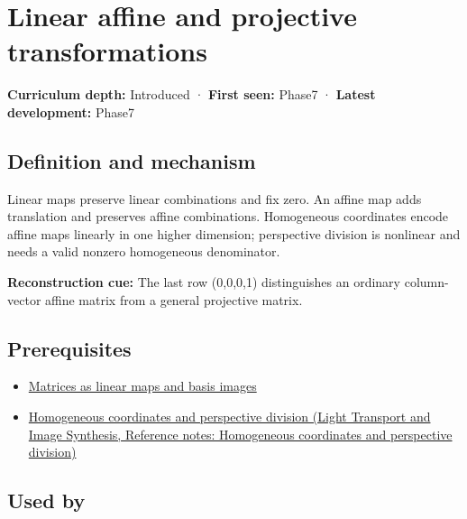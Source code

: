 \hypertarget{appendix-0bf0ca73f735}{}\label{referencestart:appendix-0bf0ca73f735}
\section{Linear affine and projective transformations}\label{appendix-0bf0ca73f735-linear-affine-and-projective-transformations}

\textbf{Curriculum depth:} Introduced · \textbf{First seen:} Phase7 · \textbf{Latest development:} Phase7

\begin{allmightroledefinition}

\subsection{Definition and mechanism}\label{appendix-0bf0ca73f735-definition-and-mechanism}

Linear maps preserve linear combinations and fix zero. An affine map adds translation and preserves affine combinations. Homogeneous coordinates encode affine maps linearly in one higher dimension; perspective division is nonlinear and needs a valid nonzero homogeneous denominator.

\end{allmightroledefinition}

\textbf{Reconstruction cue:} The last row (0,0,0,1) distinguishes an ordinary column-vector affine matrix from a general projective matrix.

\subsection{Prerequisites}\label{appendix-0bf0ca73f735-prerequisites}

\begin{itemize}
\tightlist
\item
  \hyperref[appendix-bd39c3bf5d64]{Matrices as linear maps and basis images}
\item
  \href{../04-Light-Transport-and-Image-Synthesis/main.pdf\#nameddest=appendix-cb3b26862282}{Homogeneous coordinates and perspective division (Light Transport and Image Synthesis, Reference notes: Homogeneous coordinates and perspective division)}
\end{itemize}

\subsection{Used by}\label{appendix-0bf0ca73f735-used-by}


